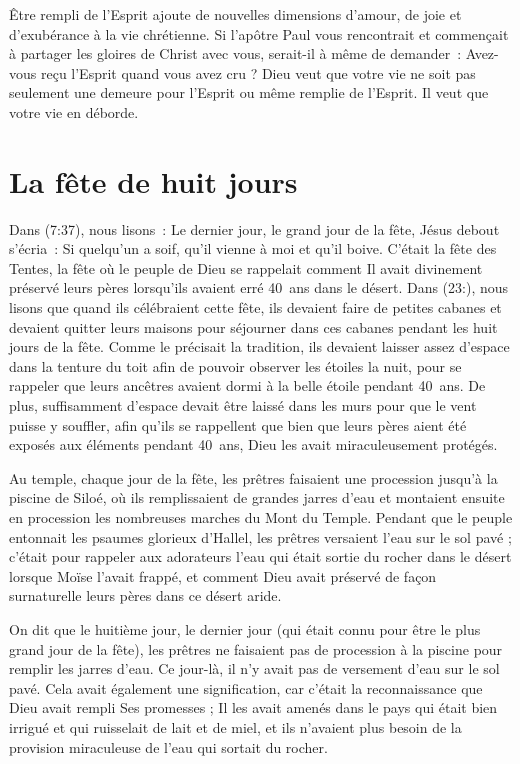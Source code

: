 Être rempli de l'Esprit ajoute de nouvelles dimensions d'amour,
 de joie et d'exubérance à la vie chrétienne.
 Si l'apôtre Paul vous rencontrait et commençait à partager les gloires
 de Christ avec vous, serait-il à même de demander~:
 \og Avez-vous reçu l'Esprit quand vous avez cru ? \fg{}
 Dieu veut que votre vie ne soit pas seulement une demeure
 pour l'Esprit ou même remplie de l'Esprit.
 Il veut que votre vie en déborde.


\section{La f\^ete de huit jours}

Dans (7:37), nous lisons~:
 \og Le dernier jour, le grand jour de la fête, Jésus debout s'écria~:
 Si quelqu'un a soif, qu'il vienne à moi et qu'il boive. \fg{}
 C'était la fête des Tentes, la fête où le peuple de Dieu se rappelait
 comment Il avait divinement préservé leurs pères lorsqu'ils avaient erré
 40~ans dans le désert.
 Dans (23:), nous lisons que quand ils célébraient cette fête,
 ils devaient faire de petites cabanes et devaient quitter leurs maisons
 pour séjourner dans ces cabanes pendant les huit jours de la fête.
 Comme le précisait la tradition, ils devaient laisser assez d'espace
 dans la tenture du toit afin de pouvoir observer les étoiles la nuit,
 pour se rappeler que leurs ancêtres avaient dormi à la belle étoile
 pendant 40~ans. De plus, suffisamment d'espace devait être laissé
 dans les murs pour que le vent puisse y souffler, afin qu'ils se rappellent
 que bien que leurs pères aient été exposés aux éléments pendant 40~ans,
 Dieu les avait miraculeusement protégés.

\begin{specialpar}{}
Au temple, chaque jour de la fête, les prêtres faisaient une procession
 jusqu'à la piscine de Siloé, où ils remplissaient de grandes jarres d'eau
 et montaient ensuite en procession les nombreuses marches du Mont du Temple.
 Pendant que le peuple entonnait les psaumes glorieux d'Hallel,
 les prêtres versaient l'eau sur le sol pavé ; c'était pour rappeler
 aux adorateurs l'eau qui était sortie du rocher dans le désert lorsque Moïse
 l'avait frappé, et comment Dieu avait préservé de façon surnaturelle
 leurs pères dans ce désert aride. 
\end{specialpar}

On dit que le huitième jour, le dernier jour (qui était connu pour être
 le plus grand jour de la fête), les prêtres ne faisaient pas de procession
 à la piscine pour remplir les jarres d'eau.
 Ce jour-là, il n'y avait pas de versement d'eau sur le sol pavé.
 Cela avait également une signification, car c'était la reconnaissance
 que Dieu avait rempli Ses promesses ; Il les avait amenés dans le pays
 qui était bien irrigué et qui ruisselait de lait et de miel,
 et ils n'avaient plus besoin de la provision miraculeuse de l'eau
 qui sortait du rocher.

